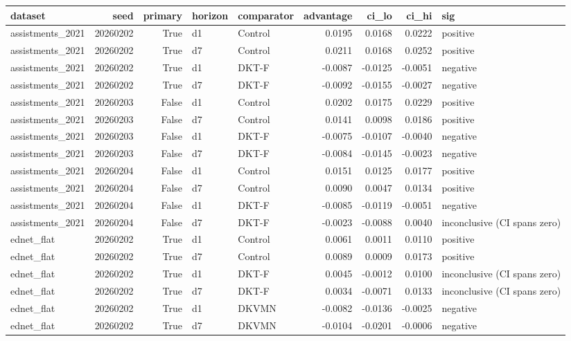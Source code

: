 \begin{tabular}{lrrllrrrl}
\toprule
dataset & seed & primary & horizon & comparator & advantage & ci\_lo & ci\_hi & sig \\
\midrule
assistments\_2021 & 20260202 & True & d1 & Control & 0.0195 & 0.0168 & 0.0222 & positive \\
assistments\_2021 & 20260202 & True & d7 & Control & 0.0211 & 0.0168 & 0.0252 & positive \\
assistments\_2021 & 20260202 & True & d1 & DKT-F & -0.0087 & -0.0125 & -0.0051 & negative \\
assistments\_2021 & 20260202 & True & d7 & DKT-F & -0.0092 & -0.0155 & -0.0027 & negative \\
assistments\_2021 & 20260203 & False & d1 & Control & 0.0202 & 0.0175 & 0.0229 & positive \\
assistments\_2021 & 20260203 & False & d7 & Control & 0.0141 & 0.0098 & 0.0186 & positive \\
assistments\_2021 & 20260203 & False & d1 & DKT-F & -0.0075 & -0.0107 & -0.0040 & negative \\
assistments\_2021 & 20260203 & False & d7 & DKT-F & -0.0084 & -0.0145 & -0.0023 & negative \\
assistments\_2021 & 20260204 & False & d1 & Control & 0.0151 & 0.0125 & 0.0177 & positive \\
assistments\_2021 & 20260204 & False & d7 & Control & 0.0090 & 0.0047 & 0.0134 & positive \\
assistments\_2021 & 20260204 & False & d1 & DKT-F & -0.0085 & -0.0119 & -0.0051 & negative \\
assistments\_2021 & 20260204 & False & d7 & DKT-F & -0.0023 & -0.0088 & 0.0040 & inconclusive (CI spans zero) \\
ednet\_flat & 20260202 & True & d1 & Control & 0.0061 & 0.0011 & 0.0110 & positive \\
ednet\_flat & 20260202 & True & d7 & Control & 0.0089 & 0.0009 & 0.0173 & positive \\
ednet\_flat & 20260202 & True & d1 & DKT-F & 0.0045 & -0.0012 & 0.0100 & inconclusive (CI spans zero) \\
ednet\_flat & 20260202 & True & d7 & DKT-F & 0.0034 & -0.0071 & 0.0133 & inconclusive (CI spans zero) \\
ednet\_flat & 20260202 & True & d1 & DKVMN & -0.0082 & -0.0136 & -0.0025 & negative \\
ednet\_flat & 20260202 & True & d7 & DKVMN & -0.0104 & -0.0201 & -0.0006 & negative \\

\end{tabular}
